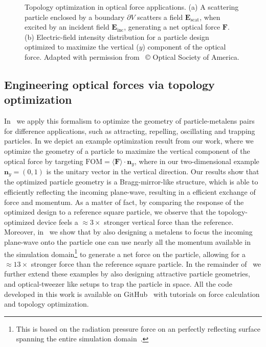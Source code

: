 \begin{figure}[tb]
    \centering
    \caption{Topology optimization in optical force applications. (a) A scattering particle 
    enclosed by a boundary $\partial V$ scatters a field $\mathbf{E}_\text{scat}$, when excited by an incident field $\mathbf{E}_\text{inc}$, 
    generating a net optical force $\mathbf{F}$. (b) Electric-field intensity distribution for a particle design optimized to maximize the vertical ($y$)
    component of the optical force. Adapted with permission from~\cite{ownpub2} © Optical Society of America.}
    \label{fig:eng_res}
\end{figure}

\subsection*{Engineering optical forces via topology optimization}

In~\cite{ownpub2} we apply this formalism to optimize the geometry of particle-metalens pairs for difference applications, such as attracting, repelling, 
oscillating and trapping particles. In  we depict an example optimization result from our work, where 
we optimize the geometry of a particle to maximize the vertical component of the optical force by targeting $\text{FOM} = \langle\mathbf{F}\rangle \cdot \mathbf{n}_y$, where
in our two-dimensional example $\mathbf{n}_y = (0, 1)$ is the unitary vector in the vertical direction.  Our results show that the optimized particle geometry is a Bragg-mirror-like
structure, which is able to efficiently reflecting the incoming plane-wave, resulting in a efficient exchange of force and momentum. As a matter of fact, by comparing the response of the optimized design
to a reference square particle, we observe that the topology-optimized device feels a $\approx 3\times$ stronger vertical force than the reference.
 Moreover, in~\cite{ownpub2} we show that by also designing a metalens to focus the incoming plane-wave onto the particle one can use nearly all the momentum available in the simulation domain\footnote{This is based on the radiation pressure force on an perfectly reflecting surface spanning the entire simulation domain~\cite{ownpub2}.} 
 to generate a net force on the particle, allowing for a $\approx 13\times$ stronger force than the reference square particle. 
 In the remainder of~\cite{ownpub2} we further extend these examples by also designing
attractive particle geometries, and optical-tweezer like setups to trap the particle in space. All the code developed in this work is available on GitHub~\cite{github_MST} with tutorials on force calculation and topology optimization. 

